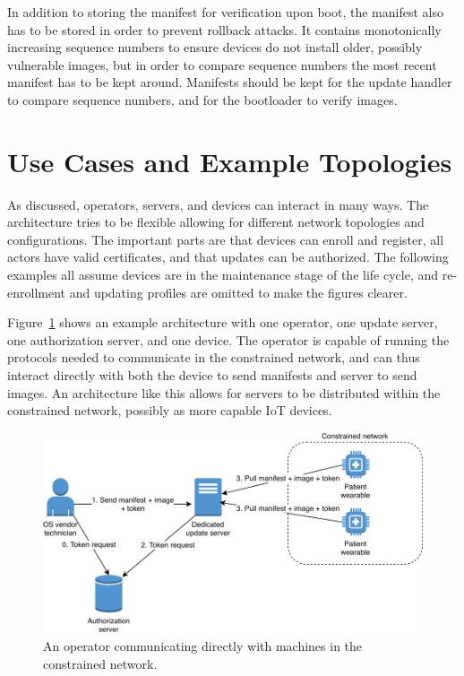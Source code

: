 \documentclass[0-thesis.tex]{subfiles}
\begin{document}
In addition to storing the manifest for verification upon boot, the manifest also has to
be stored in order to prevent rollback attacks. It contains monotonically increasing
sequence numbers to ensure devices do not install older, possibly vulnerable images, but
in order to compare sequence numbers the most recent manifest has to be kept around.
Manifests should be kept for the update handler to compare sequence numbers, and for the
bootloader to verify images.

\section{Use Cases and Example Topologies}
\label{ssec:use-cases-examples-topologies}
As discussed, operators, servers, and devices can interact in many ways. The architecture
tries to be flexible allowing for different network topologies and configurations. The
important parts are that devices can enroll and register, all actors have valid
certificates, and that updates can be authorized. The following examples all assume
devices are in the maintenance stage of the life cycle, and re-enrollment and updating
profiles are omitted to make the figures clearer.

Figure~\ref{fig:elderly-home} shows an example architecture with one operator, one
update server, one authorization server, and one device. The operator is capable of
running the protocols needed to communicate in the constrained network, and can thus
interact directly with both the device to send manifests and server to send images. An
architecture like this allows for servers to be distributed within the constrained
network, possibly as more capable IoT devices.

\begin{figure}
    \caption{An operator communicating directly with machines in the constrained network.}
    \label{fig:elderly-home}
    \includegraphics{images/use-case-elderly-home.pdf}
\end{figure}
\end{document}
